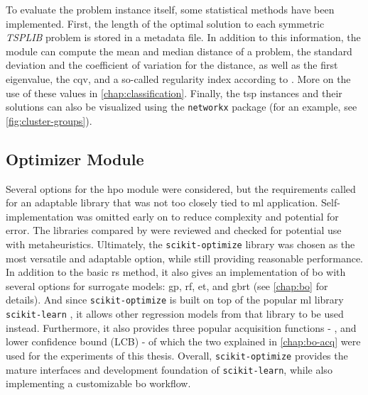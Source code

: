 To evaluate the problem instance itself, some statistical methods have been implemented. First, the length of the optimal solution to each symmetric \textit{TSPLIB} problem is stored in a metadata file. In addition to this information, the module can compute the mean and median distance of a problem, the standard deviation and the coefficient of variation for the distance, as well as the first eigenvalue, the \gls{cqv}, and a so-called regularity index according to \cite{clark1954distance, cricsan2021randomness, dry2012clustering}. More on the use of these values in \cref{chap:classification}.
Finally, the \gls{tsp} instances and their solutions can also be visualized using the \texttt{networkx} package \cite{hagberg2008exploring} (for an example, see \cref{fig:cluster-groups}).


\subsection{Optimizer Module}
\label{chap:optimizer}

Several options for the \gls{hpo} module were considered, but the requirements called for an adaptable library that was not too closely tied to \gls{ml} application. Self-implementation was omitted early on to reduce complexity and potential for error. The libraries compared by \citet{yang2020hyperparameter} were reviewed and checked for potential use with metaheuristics. Ultimately, the \texttt{scikit-optimize} library \cite{head2020scikit} was chosen as the most versatile and adaptable option, while still providing reasonable performance. In addition to the basic \gls{rs} method, it also gives an implementation of \glsdesc{bo} with several options for surrogate models: \gls{gp}, \gls{rf}, \gls{et}, and \gls{gbrt} (see \cref{chap:bo} for details). And since \texttt{scikit-optimize} is built on top of the popular \gls{ml} library \texttt{scikit-learn} \cite{scikit-learn2011}, it allows other  regression models from that library to be used instead. Furthermore, it also provides three popular acquisition functions - ,  and lower confidence bound (LCB) - of which the two explained in \cref{chap:bo-acq} were used for the experiments of this thesis.
Overall, \texttt{scikit-optimize} provides the mature interfaces and development foundation of \texttt{scikit-learn}, while also implementing a customizable \glsdesc{bo} workflow.

